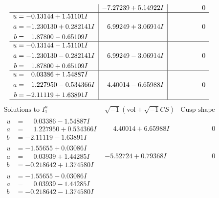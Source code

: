 \documentclass[1p]{elsarticle_modified}
\theoremstyle{definition}
\newcommand{\I}{\sqrt{-1}}
\begin{document}
$$\begin{array}{c|c|c}
 & -7.27239 + 5.14922 I & \phantom{-0.000000 } 0 \\ \hline\begin{aligned}
u &= -0.13144 + 1.51101 I \\
a &= -1.230130 + 0.282141 I \\
b &= \phantom{-}1.87800 - 0.65109 I\end{aligned}
 & \phantom{-}6.99249 + 3.06914 I & \phantom{-0.000000 } 0 \\ \hline\begin{aligned}
u &= -0.13144 - 1.51101 I \\
a &= -1.230130 - 0.282141 I \\
b &= \phantom{-}1.87800 + 0.65109 I\end{aligned}
 & \phantom{-}6.99249 - 3.06914 I & \phantom{-0.000000 } 0 \\ \hline\begin{aligned}
u &= \phantom{-}0.03386 + 1.54887 I \\
a &= \phantom{-}1.227950 - 0.534366 I \\
b &= -2.11119 + 1.63891 I\end{aligned}
 & \phantom{-}4.40014 - 6.65988 I & \phantom{-0.000000 } 0\\
 \hline 
 \end{array}$$\newpage$$\begin{array}{c|c|c}  
\text{Solutions to }I^u_{1}& \I (\text{vol} + \sqrt{-1}CS) & \text{Cusp shape}\\
 \hline 
\begin{aligned}
u &= \phantom{-}0.03386 - 1.54887 I \\
a &= \phantom{-}1.227950 + 0.534366 I \\
b &= -2.11119 - 1.63891 I\end{aligned}
 & \phantom{-}4.40014 + 6.65988 I & \phantom{-0.000000 } 0 \\ \hline\begin{aligned}
u &= -1.55655 + 0.03086 I \\
a &= \phantom{-}0.03939 + 1.44285 I \\
b &= -0.218642 + 1.374580 I\end{aligned}
 & -5.52724 + 0.79368 I & \phantom{-0.000000 } 0 \\ \hline\begin{aligned}
u &= -1.55655 - 0.03086 I \\
a &= \phantom{-}0.03939 - 1.44285 I \\
b &= -0.218642 - 1.374580 I\end{aligned}

\end{array}$$
\end{document}
